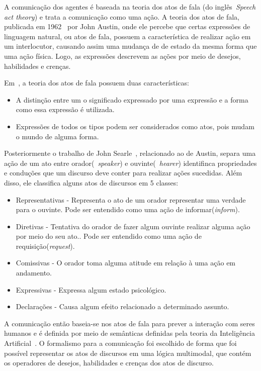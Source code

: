 A comunicação dos agentes é baseada na teoria dos atos de fala (do inglês~\emph{Speech act theory}) e trata a comunicação como uma ação. A teoria dos atos de fala, publicada em 1962~\cite{austin62} por John Austin, onde ele percebe que certas expressões de linguagem natural, ou atos de fala, possuem a característica de realizar ação em um interlocutor, causando assim uma mudança de de estado da mesma forma que uma ação física. Logo, as expressões descrevem as ações por meio de desejos, habilidades e crenças.

Em~\cite{verschueren09}, a teoria dos atos de fala possuem duas características:
\begin{itemize}
	\item A distinção entre um o significado expressado por uma expressão e a forma como essa expressão é utilizada.
	\item Expressões de todos os tipos podem ser considerados como atos, pois mudam o mundo de alguma forma.
\end{itemize}

Posteriormente o trabalho de John Searle~\cite{searle69}, relacionado ao de Austin, separa uma ação de um ato entre orador(~\emph{speaker}) e ouvinte(~\emph{hearer}) identifinca propriedades e conduções que um discurso deve conter para realizar ações sucedidas. Além disso, ele classifica alguns atos de discursos em 5 classes:
\begin{itemize}
	\item Representativas - Representa o ato de um orador representar uma verdade para o ouvinte. Pode ser entendido como uma ação de informar(\emph{inform}).
	\item Diretivas - Tentativa do orador de fazer algum ouvinte realizar alguma ação por meio do seu ato.. Pode ser entendido como uma ação de requisição(\emph{request}).
	\item Comissivas - O orador toma alguma atitude em relação à uma ação em andamento.
	\item Expressivas - Expressa algum estado psicológico.
	\item Declarações - Causa algum efeito relacionado a determinado assunto.
\end{itemize}

A comunicação então baseia-se nos atos de fala para prever a interação com seres humanos e é definida por meio de semânticas definidas pela teoria da Inteligência Artificial~\cite{wooldridge04}. O formalismo para a comunicação foi escolhido de forma que foi possível representar os atos de discursos em uma lógica multimodal, que contém os operadores de desejos, habilidades e crenças dos atos de discurso.


